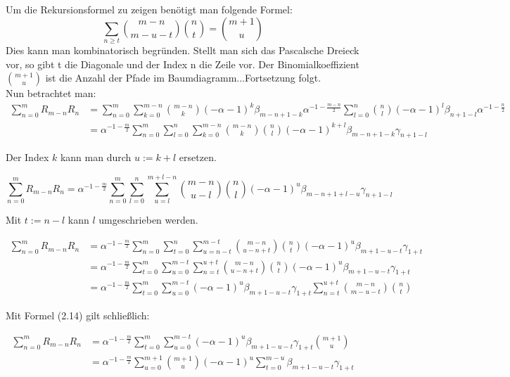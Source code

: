 \documentclass[a4paper, 11pt]{scrreprt}
\begin{document}
Um die Rekursionsformel zu zeigen benötigt man folgende Formel:
\begin{equation}
	\sum_{n \geq t} \binom{m-n}{m-u-t} \binom{n}{t} = \binom{m+1}{u}
\end{equation}
Dies kann man kombinatorisch begründen. Stellt man sich das Pascalsche Dreieck vor, so gibt t die Diagonale und der Index n die Zeile vor. Der Binomialkoeffizient \(\binom{m+1}{u}\) ist die Anzahl der Pfade im Baumdiagramm...Fortsetzung folgt. \\

Nun betrachtet man:
\begin{align*}
\sum_{n=0}^m R_{m-n} R_n 
&= \sum_{n=0}^m \sum_{k=0}^{m-n} \binom{m-n}{k} (-\alpha -1)^k \beta_{m-n+1-k} \alpha^{-1-\frac{m-n}{2}} \sum_{l=0}^n \binom{n}{l} (-\alpha -1)^l \beta_{n+1-l} \alpha^{-1-\frac{n}{2}} \\
&= \alpha^{-1-\frac{m}{2}} \sum_{n=0}^m \sum_{l=0}^n \sum_{k=0}^{m-n} \binom{m-n}{k}  \binom{n}{l} (-\alpha -1)^{k+l} \beta_{m-n+1-k} \gamma_{n+1-l}	
\end{align*}

Der Index $k$ kann man durch $u:=k+l$ ersetzen.

\[\sum_{n=0}^m R_{m-n} R_n = \alpha^{-1-\frac{m}{2}} \sum_{n=0}^m \sum_{l=0}^n \sum_{u=l}^{m+l-n} \binom{m-n}{u-l}  \binom{n}{l} (-\alpha -1)^u \beta_{m-n+1+l-u} \gamma_{n+1-l}\]

Mit $t:=n-l$ kann $l$ umgeschrieben werden.

\begin{align*}
\sum_{n=0}^m R_{m-n} R_n 
&= \alpha^{-1-\frac{m}{2}} \sum_{n=0}^m \sum_{t=0}^n \sum_{u=n-t}^{m-t} \binom{m-n}{u-n+t}  \binom{n}{t} (-\alpha -1)^u \beta_{m+1-u-t} \gamma_{1+t} \\
&= \alpha^{-1-\frac{m}{2}} \sum_{t=0}^m \sum_{u=0}^{m-t} \sum_{n=t}^{u+t} \binom{m-n}{u-n+t}  \binom{n}{t} (-\alpha -1)^u \beta_{m+1-u-t} \gamma_{1+t} \\
&= \alpha^{-1-\frac{m}{2}} \sum_{t=0}^{m} \sum_{u=0}^{m-t} (-\alpha -1)^u \beta_{m+1-u-t} \gamma_{1+t} \sum_{n=t}^{u+t} \binom{m-n}{m-u-t}  \binom{n}{t}
\end{align*}

Mit Formel (2.14) gilt schließlich:

\begin{align*}
\sum_{n=0}^m R_{m-n} R_n 
&= \alpha^{-1-\frac{m}{2}} \sum_{t=0}^m \sum_{u=0}^{m-t} (-\alpha -1)^u \beta_{m+1-u-t} \gamma_{1+t} \binom{m+1}{u} \\
&= \alpha^{-1-\frac{m}{2}} \sum_{u=0}^{m+1} \binom{m+1}{u} (-\alpha -1)^u \sum_{t=0}^{m-u} \beta_{m+1-u-t} \gamma_{1+t}
\end{align*}
\end{document}
